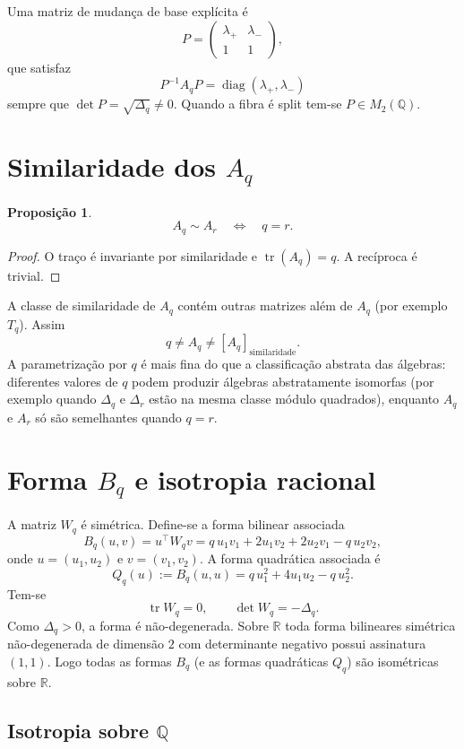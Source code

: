 \documentclass[11pt,a4paper]{article}
\newtheorem{proposicao}{Proposição}
\begin{document}
Uma matriz de mudança de base explícita é
\[
P=\begin{pmatrix}\lambda_+&\lambda_-\\1&1\end{pmatrix},
\]
que satisfaz
\[
P^{-1}A_qP=\operatorname{diag}(\lambda_+,\lambda_-)
\]
sempre que \(\det P=\sqrt{\Delta_q}\neq 0\). Quando a fibra é split tem-se
\(P\in M_2(\mathbb{Q})\).

\section{Similaridade dos \(A_q\)}

\begin{proposicao}
\[
A_q\sim A_r\quad\Longleftrightarrow\quad q=r.
\]
\end{proposicao}

\begin{proof}
O traço é invariante por similaridade e \(\operatorname{tr}(A_q)=q\).
A recíproca é trivial.
\end{proof}

A classe de similaridade de \(A_q\) contém outras matrizes além de \(A_q\)
(por exemplo \(T_q\)). Assim
\[
q\neq A_q\neq[A_q]_{\mathrm{similaridade}}.
\]
A parametrização por \(q\) é mais fina do que a classificação abstrata das
álgebras: diferentes valores de \(q\) podem produzir álgebras
abstratamente isomorfas (por exemplo quando \(\Delta_q\) e \(\Delta_r\)
estão na mesma classe módulo quadrados), enquanto \(A_q\) e \(A_r\) só
são semelhantes quando \(q=r\).

\section{Forma \(B_q\) e isotropia racional}

A matriz \(W_q\) é simétrica. Define-se a forma bilinear associada
\[
B_q(u,v)=u^\top W_q v
=
q\,u_1v_1+2u_1v_2+2u_2v_1-q\,u_2v_2,
\]
onde \(u=(u_1,u_2)\) e \(v=(v_1,v_2)\). A forma quadrática associada é
\[
Q_q(u):=B_q(u,u)=q\,u_1^2+4u_1u_2-q\,u_2^2.
\]
Tem-se
\[
\operatorname{tr}W_q=0,\qquad\det W_q=-\Delta_q.
\]
Como \(\Delta_q>0\), a forma é não-degenerada. Sobre \(\mathbb{R}\) toda
forma bilineares simétrica não-degenerada de dimensão \(2\) com
determinante negativo possui assinatura \((1,1)\). Logo todas as formas
\(B_q\) (e as formas quadráticas \(Q_q\)) são isométricas sobre \(\mathbb{R}\).

\subsection{Isotropia sobre \(\mathbb{Q}\)}
\end{document}

